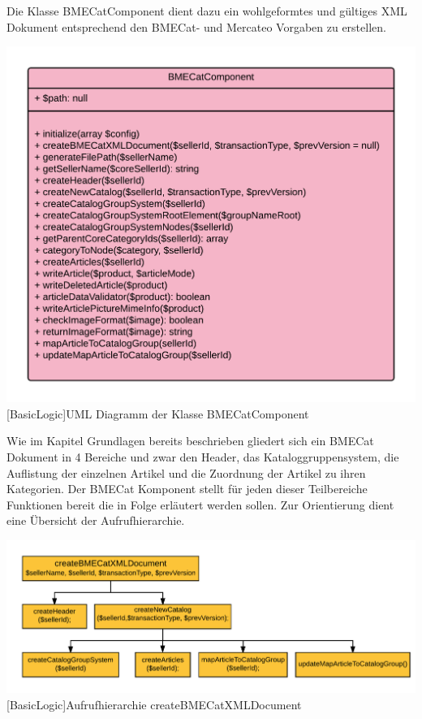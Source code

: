 	Die Klasse BMECatComponent dient dazu ein wohlgeformtes und gültiges XML Dokument entsprechend den BMECat- und Mercateo Vorgaben zu erstellen. \\
	\begin{minipage}{\linewidth}
		\vspace{1em}
		\centering
		\includegraphics[width=0.8 \linewidth]{img/BMECatComponentUML}
		[BasicLogic]{UML Diagramm der Klasse BMECatComponent}
		\vspace{1em}
	\end{minipage}
	Wie im Kapitel Grundlagen bereits beschrieben gliedert sich ein BMECat Dokument in 4 Bereiche und zwar den Header, das Kataloggruppensystem, die Auflistung der einzelnen Artikel und die Zuordnung der Artikel zu ihren Kategorien. Der BMECat Komponent stellt für jeden dieser Teilbereiche Funktionen bereit die in Folge erläutert werden sollen.
	Zur Orientierung dient eine Übersicht der Aufrufhierarchie.\\
	
	\begin{minipage}{\linewidth}
		\vspace{1em}
		\centering
		\includegraphics[width=0.8 \linewidth]{img/createBMECatHierarchie}
		[BasicLogic]{Aufrufhierarchie createBMECatXMLDocument}
		\vspace{1em}
	\end{minipage}
	

